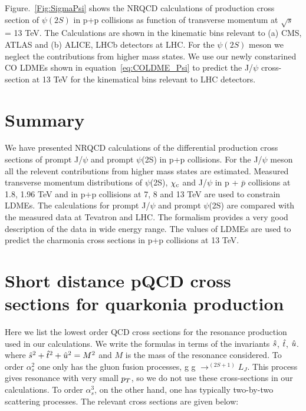 \documentclass[aps,prc,preprint,superscriptaddress,showpacs,showkeys,amsmath]{revtex4-1}
\begin{document}
Figure.~\ref{Fig:SigmaPsi} shows the NRQCD calculations of production cross section of $\psi(2S)$ in p+p collisions 
as function of transverse momentum at $\sqrt{s}$ = 13 TeV. The Calculations are shown in the kinematic
bins relevant to (a) CMS, ATLAS and (b) ALICE, LHCb detectors at LHC. For the $\psi(2S)$ meson we neglect the
contributions from higher mass states. We use our newly constarined CO LDMEs
shown in equation~\ref{eq:COLDME_Psi} to predict the J/$\psi$ cross-section at 13 TeV for the 
kinematical bins relevant to LHC detectors.




\section{Summary}
  We have presented NRQCD calculations of the differential production 
cross sections of prompt J/$\psi$ and prompt $\psi$(2S) in  p+p collisions.
For the J/$\psi$ meson all the relevent contributions from higher mass states 
are estimated. 
 Measured transverse momentum distributions of 
$\psi$(2S), $\chi_{\rm c}$ and J/$\psi$ in p + {$\bar p$} collisions at 1.8, 1.96 TeV 
and in p+p collisions at 7, 8 and 13 TeV are used to constrain LDMEs. 
 The calculations for  prompt J/$\psi$ and prompt $\psi$(2S) are compared with the measured 
data at Tevatron and LHC. 
  The formalism provides a very good description of the data in wide energy range. 
The values of LDMEs are used to predict the charmonia cross sections in p+p collisions 
at 13 TeV.



\newpage
\appendix

\section{Short distance pQCD cross sections for quarkonia production}
\label{section:pqcd}
  Here we list the lowest order QCD cross sections for the resonance production used 
in our calculations. We write the formulas in terms of the invariants ${\hat{s}}$, ${\hat{t}}$, ${\hat{u}}$.
where ${\hat{s}}^2 + {\hat{t}}^2 + {\hat{u}}^2 = M^2$ and $M$ is the mass of the resonance considered.
  To order $\alpha_{s}^{2}$ one only has the gluon fusion processes, 
g g $\rightarrow ^{(2S+1)}L_{J}$. This process gives resonance with very small $p_{T}$, 
so we do not use these cross-sections in our calculations.
To order $\alpha_{s}^{3}$, on the other hand, one has typically two-by-two 
scattering processes. The relevant cross sections are given below:
\end{document}
